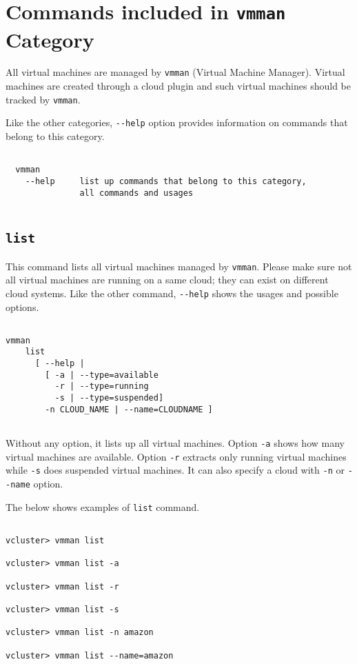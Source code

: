\documentclass[11pt]{article}
\def \ttt{\texttt}
\def \vb{\verb}
\begin{document}
\newpage

\section{Commands included in \ttt{vmman} Category}

All virtual machines are managed by \vb+vmman+ (Virtual Machine Manager). Virtual machines are created through a cloud plugin and such virtual machines should be tracked by \vb+vmman+.

Like the other categories, \vb+--help+ option provides information on commands that belong to this category.


\begin{Verbatim}[fontfamily=courier, fontsize = \small, obeytabs
=true, tabsize=4, frame=lines]

  vmman 
    --help     list up commands that belong to this category, 
               all commands and usages
  
\end{Verbatim}


\subsection{\ttt{list}}

This command lists all virtual machines managed by \vb+vmman+. Please make sure not all virtual machines are running on a same cloud; they can exist on different cloud systems. Like the other command, \vb+--help+ shows the usages and possible options.

\begin{Verbatim}[fontfamily=courier, fontsize = \small, obeytabs
=true, tabsize=4, frame=lines]

vmman 
    list 
      [ --help |
        [ -a | --type=available 
          -r | --type=running 
          -s | --type=suspended]
        -n CLOUD_NAME | --name=CLOUDNAME ] 
      
\end{Verbatim}

Without any option, it lists up all virtual machines. Option \vb+-a+ shows how many virtual machines are available. Option \vb+-r+ extracts only running virtual machines while \vb+-s+ does suspended virtual machines.  It can also specify a cloud with \vb+-n+ or \vb+--name+ option. 

The below shows examples of \vb+list+ command.

\begin{Verbatim}[fontfamily=courier, fontsize = \small, obeytabs
=true, tabsize=4, frame=lines]

vcluster> vmman list

vcluster> vmman list -a

vcluster> vmman list -r

vcluster> vmman list -s

vcluster> vmman list -n amazon

vcluster> vmman list --name=amazon

\end{Verbatim}
\end{document}
